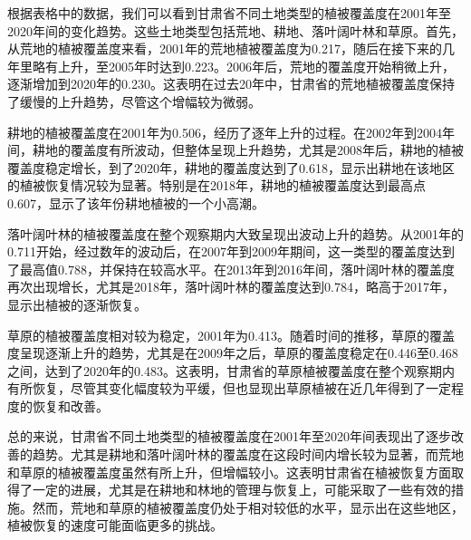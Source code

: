 \documentclass[AutoFakeBold]{LZUThesis-PgD&PhD}
\begin{document}
		根据表格中的数据，我们可以看到甘肃省不同土地类型的植被覆盖度在2001年至2020年间的变化趋势。这些土地类型包括荒地、耕地、落叶阔叶林和草原。首先，从荒地的植被覆盖度来看，2001年的荒地植被覆盖度为0.217，随后在接下来的几年里略有上升，至2005年时达到0.223。2006年后，荒地的覆盖度开始稍微上升，逐渐增加到2020年的0.230。这表明在过去20年中，甘肃省的荒地植被覆盖度保持了缓慢的上升趋势，尽管这个增幅较为微弱。
		
		耕地的植被覆盖度在2001年为0.506，经历了逐年上升的过程。在2002年到2004年间，耕地的覆盖度有所波动，但整体呈现上升趋势，尤其是2008年后，耕地的植被覆盖度稳定增长，到了2020年，耕地的覆盖度达到了0.618，显示出耕地在该地区的植被恢复情况较为显著。特别是在2018年，耕地的植被覆盖度达到最高点0.607，显示了该年份耕地植被的一个小高潮。
		
		落叶阔叶林的植被覆盖度在整个观察期内大致呈现出波动上升的趋势。从2001年的0.711开始，经过数年的波动后，在2007年到2009年期间，这一类型的覆盖度达到了最高值0.788，并保持在较高水平。在2013年到2016年间，落叶阔叶林的覆盖度再次出现增长，尤其是2018年，落叶阔叶林的覆盖度达到0.784，略高于2017年，显示出植被的逐渐恢复。
		
		草原的植被覆盖度相对较为稳定，2001年为0.413。随着时间的推移，草原的覆盖度呈现逐渐上升的趋势，尤其是在2009年之后，草原的覆盖度稳定在0.446至0.468之间，达到了2020年的0.483。这表明，甘肃省的草原植被覆盖度在整个观察期内有所恢复，尽管其变化幅度较为平缓，但也显现出草原植被在近几年得到了一定程度的恢复和改善。
		
		总的来说，甘肃省不同土地类型的植被覆盖度在2001年至2020年间表现出了逐步改善的趋势。尤其是耕地和落叶阔叶林的覆盖度在这段时间内增长较为显著，而荒地和草原的植被覆盖度虽然有所上升，但增幅较小。这表明甘肃省在植被恢复方面取得了一定的进展，尤其是在耕地和林地的管理与恢复上，可能采取了一些有效的措施。然而，荒地和草原的植被覆盖度仍处于相对较低的水平，显示出在这些地区，植被恢复的速度可能面临更多的挑战。
		
\end{document}
